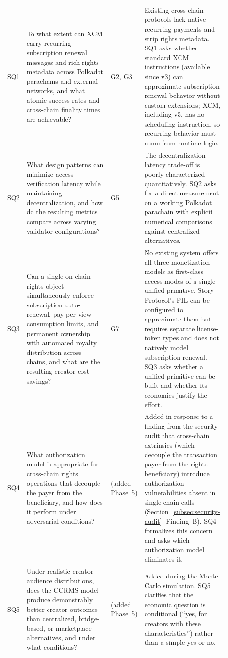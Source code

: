 \begin{longtable}{@{}L{0.05\linewidth} L{0.38\linewidth} L{0.10\linewidth} L{0.37\linewidth}@{}}
SQ1 & To what extent can XCM carry recurring subscription renewal messages and rich rights metadata across Polkadot parachains and external networks, and what atomic success rates and cross-chain finality times are achievable? & G2, G3 & Existing cross-chain protocols lack native recurring payments and strip rights metadata. SQ1 asks whether standard XCM instructions (available since v3) can approximate subscription renewal behavior without custom extensions; XCM, including v5, has no scheduling instruction, so recurring behavior must come from runtime logic. \\
\addlinespace
SQ2 & What design patterns can minimize access verification latency while maintaining decentralization, and how do the resulting metrics compare across varying validator configurations? & G5 & The decentralization-latency trade-off is poorly characterized quantitatively. SQ2 asks for a direct measurement on a working Polkadot parachain with explicit numerical comparisons against centralized alternatives. \\
\addlinespace
SQ3 & Can a single on-chain rights object simultaneously enforce subscription auto-renewal, pay-per-view consumption limits, and permanent ownership with automated royalty distribution across chains, and what are the resulting creator cost savings? & G7 & No existing system offers all three monetization models as first-class access modes of a single unified primitive. Story Protocol's PIL can be configured to approximate them but requires separate license-token types and does not natively model subscription renewal. SQ3 asks whether a unified primitive can be built and whether its economics justify the effort. \\
\addlinespace
SQ4 & What authorization model is appropriate for cross-chain rights operations that decouple the payer from the beneficiary, and how does it perform under adversarial conditions? & (added Phase~5) & Added in response to a finding from the security audit that cross-chain extrinsics (which decouple the transaction payer from the rights beneficiary) introduce authorization vulnerabilities absent in single-chain calls (Section~\ref{subsec:security-audit}, Finding~B). SQ4 formalizes this concern and asks which authorization model eliminates it. \\
\addlinespace
SQ5 & Under realistic creator audience distributions, does the CCRMS model produce demonstrably better creator outcomes than centralized, bridge-based, or marketplace alternatives, and under what conditions? & (added Phase~5) & Added during the Monte Carlo simulation. SQ5 clarifies that the economic question is conditional (``yes, for creators with these characteristics'') rather than a simple yes-or-no. \\
\end{longtable}

